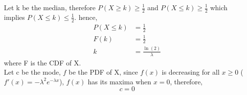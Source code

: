 Let k be the median, therefore $P(X \ge k) \ge \frac{1}{2}$ and $P(X \le k) \ge \frac{1}{2}$ which implies $P(X \le k) \le \frac{1}{2}$.
hence,
\begin{align*}
    P(X \le k) &= \frac{1}{2} \\
    F(k) &=  \frac{1}{2} \\
    k &= \frac{\ln(2)}{\lambda}
\end{align*}
where F is the CDF of X. \\

Let c be the mode, $f$ be the PDF of X, since $f(x)$ is decreasing for all $x \ge 0$ ($f'(x) = -\lambda^{2}e^{-\lambda x}$), $f(x)$ has its maxima when $x=0$, therefore,
\[c = 0\]
